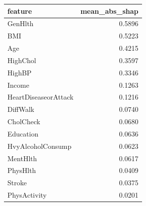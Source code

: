 \begin{tabular}{lr}
\toprule
feature & mean\_abs\_shap \\
\midrule
GenHlth & 0.5896 \\
BMI & 0.5223 \\
Age & 0.4215 \\
HighChol & 0.3597 \\
HighBP & 0.3346 \\
Income & 0.1263 \\
HeartDiseaseorAttack & 0.1216 \\
DiffWalk & 0.0740 \\
CholCheck & 0.0680 \\
Education & 0.0636 \\
HvyAlcoholConsump & 0.0623 \\
MentHlth & 0.0617 \\
PhysHlth & 0.0409 \\
Stroke & 0.0375 \\
PhysActivity & 0.0201 \\
\bottomrule
\end{tabular}
